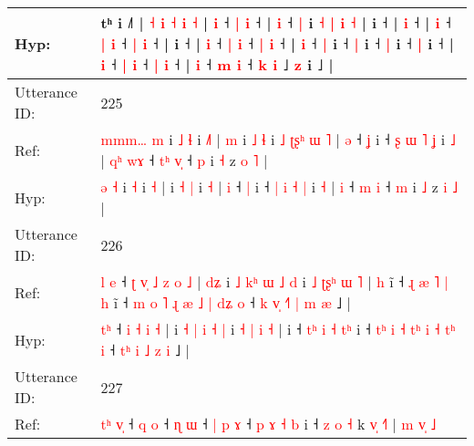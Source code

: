 \documentclass[10pt]{article}
\DeclareRobustCommand{\hl}[1]{{\textcolor{red}{#1}}}
\begin{document}
\begin{longtable}{ll}
 \\
Hyp: & tʰ i ˩˥ |\hl{}\hl{}\hl{} \hl{˧} \hl{i} \hl{˧} \hl{i} \hl{}\hl{˧} |\hl{}\hl{} \hl{i} ˧ \hl{|} \hl{i} ˧ |\hl{}\hl{} \hl{i} ˧ \hl{}\hl{|} i \hl{˧} \hl{}\hl{|} \hl{i} \hl{˧} |\hl{}\hl{}\hl{} i ˧ |\hl{}\hl{}\hl{} \hl{i} ˧\hl{}\hl{}\hl{}\hl{}\hl{} |\hl{}\hl{}\hl{} \hl{i} ˧ \hl{|} \hl{i} ˧ \hl{|} \hl{}\hl{i} ˧\hl{} |\hl{}\hl{}\hl{} i ˧ |\hl{}\hl{}\hl{} \hl{i} ˧ \hl{|} \hl{i} ˧ \hl{|} \hl{}\hl{i} ˧\hl{} | \hl{i} ˧ \hl{|} i ˧ \hl{}\hl{}\hl{|} i ˧ \hl{|} i ˧ \hl{|} i ˧\hl{} |\hl{}\hl{} \hl{i} ˧ \hl{|} \hl{i} ˧ \hl{}\hl{|} \hl{i} ˧\hl{} |\hl{}\hl{} \hl{i} ˧ \hl{}\hl{m} \hl{i} ˧ \hl{k} \hl{i} ˩ \hl{z} i ˩ |
 \\
\midrule
Utterance ID: & 225 \\
Ref: & \hl{m}\hl{m}\hl{m}\hl{…} \hl{m} i\hl{ }\hl{˩} \hl{ɬ} i \hl{˩}\hl{˥} |\hl{ }\hl{m} i \hl{˩} \hl{ɬ} i\hl{ }\hl{˩}\hl{ }\hl{ʈ}\hl{ʂ}\hl{ʰ}\hl{ }\hl{ɯ} \hl{˥} | \hl{ə} ˧ \hl{ʝ} i ˧ \hl{ʂ} \hl{ɯ} \hl{˥} \hl{ʝ} i \hl{˩} |\hl{ }\hl{q}\hl{ʰ} \hl{w}\hl{ɤ} ˧ \hl{t}\hl{ʰ} \hl{v}\hl{̩} ˧ \hl{p} i \hl{˧} z \hl{o} \hl{˥} |
 \\
Hyp: & \hl{}\hl{}\hl{}\hl{ə} \hl{˧} i\hl{}\hl{} \hl{˧} i \hl{}\hl{˧} |\hl{}\hl{} i \hl{˧} \hl{|} i\hl{}\hl{}\hl{}\hl{}\hl{}\hl{}\hl{}\hl{} \hl{˧} | \hl{i} ˧ \hl{|} i ˧ \hl{|} \hl{i} \hl{˧} \hl{|} i \hl{˧} |\hl{}\hl{}\hl{} \hl{}\hl{i} ˧ \hl{}\hl{m} \hl{}\hl{i} ˧ \hl{m} i \hl{˩} z \hl{i} \hl{˩} |
 \\
\midrule
Utterance ID: & 226 \\
Ref: & \hl{l}\hl{ }\hl{e} ˧\hl{ }\hl{ʈ}\hl{ }\hl{v}\hl{̩} \hl{˩} \hl{z} \hl{o} \hl{˩} |\hl{ }\hl{d}\hl{ʑ} i \hl{˩} \hl{k}\hl{ʰ} \hl{ɯ} \hl{˩} \hl{d} i \hl{˩} \hl{ʈ}\hl{ʂ}\hl{ʰ} \hl{ɯ} \hl{˥} |\hl{ }\hl{h} i\hl{̃} ˧ \hl{}\hl{ɻ} \hl{æ} \hl{˥} \hl{|}\hl{ }\hl{h} i\hl{̃} ˧ \hl{}\hl{m} \hl{o} \hl{˥} \hl{ɻ}\hl{ }\hl{æ} \hl{˩} \hl{|} \hl{d}\hl{ʑ} \hl{o} ˧\hl{ }\hl{k} \hl{v}\hl{̩} \hl{˧}\hl{˥} \hl{|} \hl{m} \hl{æ} ˩ |
 \\
Hyp: & \hl{}\hl{t}\hl{ʰ} ˧\hl{}\hl{}\hl{}\hl{}\hl{} \hl{i} \hl{˧} \hl{i} \hl{˧} |\hl{}\hl{}\hl{} i \hl{˧} \hl{}\hl{|} \hl{i} \hl{˧} \hl{|} i \hl{˧} \hl{}\hl{}\hl{|} \hl{i} \hl{˧} |\hl{}\hl{} i\hl{} ˧ \hl{t}\hl{ʰ} \hl{i} \hl{˧} \hl{}\hl{t}\hl{ʰ} i\hl{} ˧ \hl{t}\hl{ʰ} \hl{i} \hl{˧} \hl{}\hl{t}\hl{ʰ} \hl{i} \hl{˧} \hl{t}\hl{ʰ} \hl{i} ˧\hl{}\hl{} \hl{t}\hl{ʰ} \hl{}\hl{i} \hl{˩} \hl{z} \hl{i} ˩ |
 \\
\midrule
Utterance ID: & 227 \\
Ref: & \hl{t}\hl{ʰ}\hl{ }\hl{v}\hl{̩} ˧\hl{ }\hl{q} \hl{o} ˧\hl{ }\hl{ɳ} \hl{ɯ} ˧\hl{ }\hl{|} \hl{p} \hl{ɤ} ˧\hl{ }\hl{p}\hl{ }\hl{ɤ} \hl{˧}\hl{ }\hl{b} i ˧ \hl{z} \hl{o} \hl{˧} k \hl{v}\hl{̩} \hl{˧}\hl{˥} |\hl{ }\hl{m}\hl{ }\hl{v}\hl{̩}\hl{ }\hl{˩}

\end{longtable}
\end{document}
